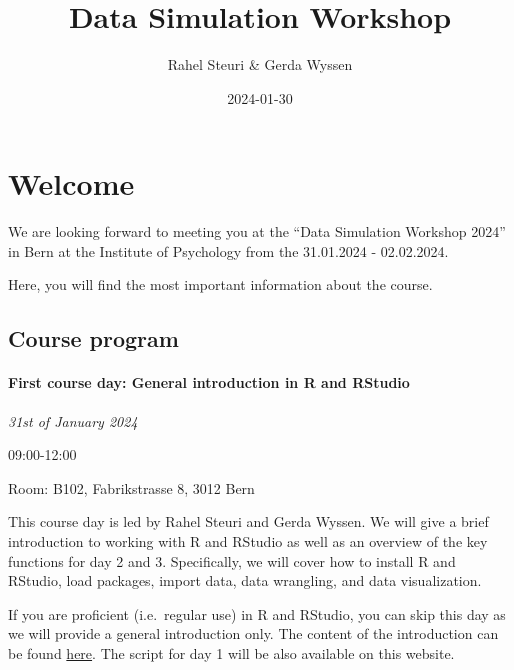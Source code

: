 \documentclass[
  letterpaper,
  DIV=11,
  numbers=noendperiod,
  oneside]{scrreprt}
\title{Data Simulation Workshop}
\author{Rahel Steuri \& Gerda Wyssen}
\date{2024-01-30}
\renewcommand*\contentsname{Table of contents}
\newcommand\contentsname{Table of contents}
\begin{document}
\maketitle
\renewcommand*\contentsname{Table of contents}
{
\hypersetup{linkcolor=}
\setcounter{tocdepth}{2}
\tableofcontents
}

\hypertarget{welcome}{%
\chapter*{Welcome}\label{welcome}}


We are looking forward to meeting you at the ``Data Simulation Workshop
2024'' in Bern at the Institute of Psychology from the 31.01.2024 -
02.02.2024.

Here, you will find the most important information about the course.

\hypertarget{course-program}{%
\section*{Course program}\label{course-program}}


\hypertarget{first-course-day-general-introduction-in-r-and-rstudio}{%
\subsubsection*{First course day: General introduction in R and
RStudio}\label{first-course-day-general-introduction-in-r-and-rstudio}}

\emph{31st of January 2024}

09:00-12:00

Room: B102, Fabrikstrasse 8, 3012 Bern

This course day is led by Rahel Steuri and Gerda Wyssen. We will give a
brief introduction to working with R and RStudio as well as an overview
of the key functions for day 2 and 3. Specifically, we will cover how to
install R and RStudio, load packages, import data, data wrangling, and
data visualization.

If you are proficient (i.e.~regular use) in R and RStudio, you can skip
this day as we will provide a general introduction only. The content of
the introduction can be found
\href{https://kogpsy.github.io/datasimulationcourse_24/introduction.html}{here}.
The script for day 1 will be also available on this website.
\end{document}

